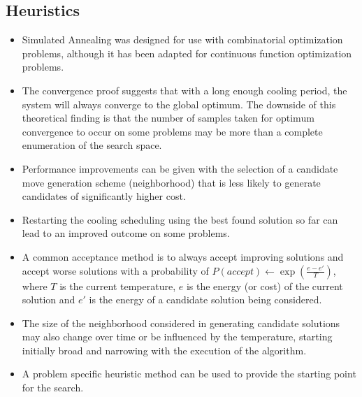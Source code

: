 \subsection{Heuristics}
\begin{itemize}
	\item Simulated Annealing was designed for use with combinatorial optimization problems, although it has been adapted for continuous function optimization problems.
	\item The convergence proof suggests that with a long enough cooling period, the system will always converge to the global optimum. The downside of this theoretical finding is that the number of samples taken for optimum convergence to occur on some problems may be more than a complete enumeration of the search space. 
	\item Performance improvements can be given with the selection of a candidate move generation scheme (neighborhood) that is less likely to generate candidates of significantly higher cost.
	\item Restarting the cooling scheduling using the best found solution so far can lead to an improved outcome on some problems.
	\item A common acceptance method is to always accept improving solutions and accept worse solutions with a probability of $P(accept) \leftarrow \exp(\frac{e-e'}{T})$, where $T$ is the current temperature, $e$ is the energy (or cost) of the current solution and $e'$ is the energy of a candidate solution being considered.
	\item The size of the neighborhood considered in generating candidate solutions may also change over time or be influenced by the temperature, starting initially broad and narrowing with the execution of the algorithm.
	\item A problem specific heuristic method can be used to provide the starting point for the search.
\end{itemize}

